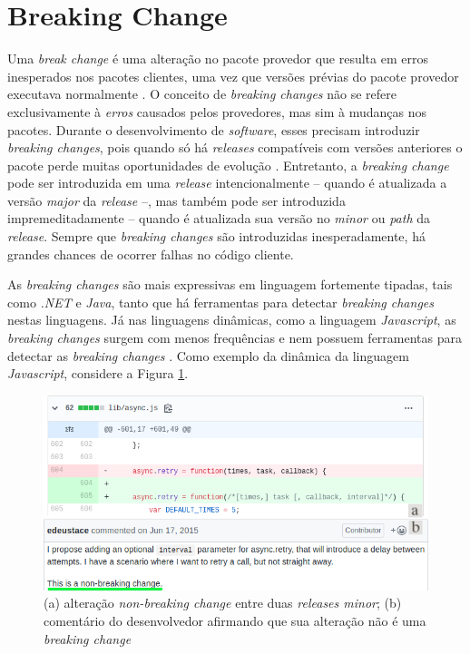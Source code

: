 \section{Breaking Change}
\label{ref-teo:breaking_change}
Uma \textit{break change} é uma alteração no pacote provedor que resulta em erros inesperados nos pacotes clientes, uma vez que versões prévias do pacote provedor executava normalmente \cite{teorical_reference:semver}. O conceito de \textit{breaking changes} não se refere exclusivamente à \textit{erros} causados pelos provedores, mas sim à mudanças nos pacotes. Durante o desenvolvimento de \textit{software}, esses precisam introduzir \textit{breaking changes}, pois quando só há \textit{releases} compatíveis com versões anteriores o pacote perde muitas oportunidades de evolução \cite{teorical_reference:bc_2}. Entretanto, a \textit{breaking change} pode ser introduzida em uma \textit{release} intencionalmente -- quando é atualizada a versão \textit{major} da \textit{release} --, mas também pode ser introduzida impremeditadamente -- quando é atualizada sua versão no \textit{minor} ou \textit{path} da \textit{release}. Sempre que \textit{breaking changes} são introduzidas inesperadamente, há grandes chances de ocorrer falhas no código cliente.

As \textit{breaking changes} são mais expressivas em linguagem fortemente tipadas, tais como \textit{.NET} e \textit{Java}, tanto que há ferramentas para detectar \textit{breaking changes} nestas linguagens. Já nas linguagens dinâmicas, como a linguagem \textit{Javascript}, as \textit{breaking changes} surgem com menos frequências e nem possuem ferramentas para detectar as \textit{breaking changes} \cite{teorical_reference:bc_1}. Como exemplo da dinâmica da linguagem \textit{Javascript}, considere a Figura \ref{fig:non-bc-async}.

\begin{figure}
    \centering
    \includegraphics[scale=0.6]{figuras/non-bc-async.png}
    \caption{(a) alteração \textit{non-breaking change} entre duas \textit{releases minor}; (b) comentário do desenvolvedor afirmando que sua alteração não é uma \textit{breaking change}}
    \label{fig:non-bc-async}
\end{figure}{}

